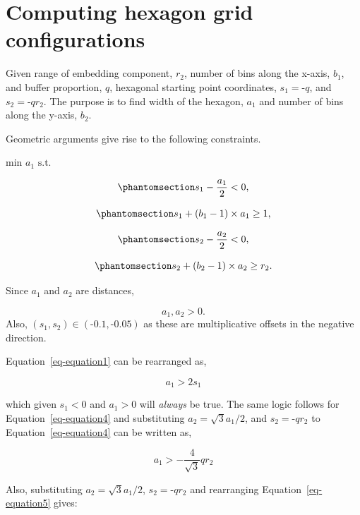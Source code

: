 \documentclass[
  12pt]{article}
\begin{document}
\section{Computing hexagon grid
configurations}\label{computing-hexagon-grid-configurations}

Given range of embedding component, \(r_2\), number of bins along the
x-axis, \(b_1\), and buffer proportion, \(q\), hexagonal starting point
coordinates, \(s_1 = \text{-}q\), and \(s_2 = \text{-}qr_2\). The
purpose is to find width of the hexagon, \(a_1\) and number of bins
along the y-axis, \(b_2\).

Geometric arguments give rise to the following constraints.

\(\text{min }a_1 \text{ s.t.}\)

\begin{equation}\protect\phantomsection\label{eq-equation1}{
s_1 - \frac{a_1}{2} < 0,
}\end{equation}

\begin{equation}\protect\phantomsection\label{eq-equation2}{
s_1 + (b_1 - 1) \times a_1 \geq 1,
}\end{equation}

\begin{equation}\protect\phantomsection\label{eq-equation4}{
s_2 - \frac{a_2}{2} < 0,
}\end{equation}

\begin{equation}\protect\phantomsection\label{eq-equation5}{
s_2 + (b_2 - 1) \times a_2 \geq r_2.
}\end{equation}

Since \(a_1\) and \(a_2\) are distances,

\[
a_1, a_2 > 0.
\] Also, \((s_1, s_2) \in (\text{-}0.1, \text{-}0.05)\) as these are
multiplicative offsets in the negative direction.

Equation~\ref{eq-equation1} can be rearranged as,

\[
a_1 > 2s_1
\]

which given \(s_1 < 0\) and \(a_1 > 0\) will \emph{always} be true. The
same logic follows for Equation~\ref{eq-equation4} and substituting
\(a_2 = \sqrt{3}a_1/{2}\), and \(s_2 = \text{-}qr_2\) to
Equation~\ref{eq-equation4} can be written as,

\[
a_1 > -\frac{4}{\sqrt{3}}qr_2
\]

Also, substituting \(a_2 = \sqrt{3}a_1/{2}\), \(s_2 = \text{-}qr_2\) and
rearranging Equation~\ref{eq-equation5} gives:
\end{document}
